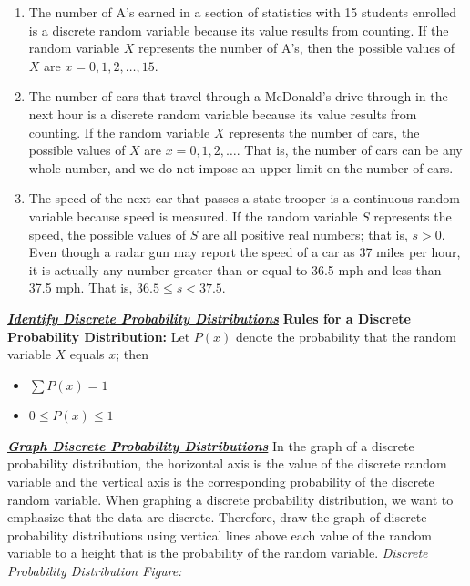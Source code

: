 \documentclass{report}
\begin{document}
    \begin{enumerate}[label=(\alph*)]
        \item The number of A's earned in a section of statistics with 15 students enrolled is a discrete random variable because its value results from counting. If the random variable $X$ represents the number of A's, then the possible values of $X$ are $x = 0, 1, 2, \ldots, 15$.
        \item The number of cars that travel through a McDonald's drive-through in the next hour is a discrete random variable because its value results from counting. If the random variable $X$ represents the number of cars, the possible values of $X$ are $x = 0, 1, 2, \ldots$. That is, the number of cars can be any whole number, and we do not impose an upper limit on the number of cars.
        \item The speed of the next car that passes a state trooper is a continuous random variable because speed is measured. If the random variable $S$ represents the speed, the possible values of $S$ are all positive real numbers; that is, $s > 0$. Even though a radar gun may report the speed of a car as 37 miles per hour, it is actually any number greater than or equal to 36.5 mph and less than 37.5 mph. That is, $36.5 \leq s < 37.5$.
    \end{enumerate}

    \bigbreak \noindent \bigbreak \noindent 
    \textbf{\textit{\underline{Identify Discrete Probability Distributions}}}
    \bigbreak \noindent 
    \textbf{Rules for a Discrete Probability Distribution:}
    \bigbreak \noindent 
    Let $P(x)$ denote the probability that the random variable $X$ equals $x$; then
    \begin{itemize}
        \item $ \sum P(x) = 1 $
        \item $0 \leq P(x) \leq 1$
    \end{itemize}

    \bigbreak \noindent \bigbreak \noindent 
    \textbf{\textit{\underline{Graph Discrete Probability Distributions}}}
    \bigbreak \noindent 
    In the graph of a discrete probability distribution, the horizontal axis is the value of the discrete random variable and the vertical axis is the corresponding probability of the discrete random variable. When graphing a discrete probability distribution, we want to emphasize that the data are discrete. Therefore, draw the graph of discrete probability distributions using vertical lines above each value of the random variable to a height that is the probability of the random variable.
    \bigbreak \noindent 
    \textit{Discrete Probability Distribution Figure:}
    \begin{figure}[ht]
        \centering
        \label{fig:enumab}
    \end{figure}
\end{document}
